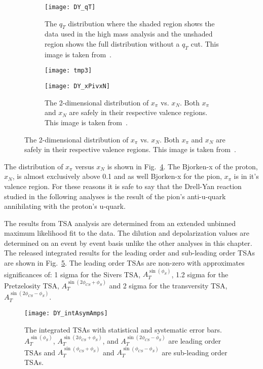 \begin{figure}[h!t]
  \centering
  \begin{subfigure}{0.45\textwidth}
    \centering \texttt{[image: DY\_qT]}
    \caption{The $q_T$ distribution where the shaded region shows the data used
      in the high mass analysis and the unshaded region shows the full
      distribution without a $q_T$ cut.  This image is taken
      from~\cite{compassDYpaper}.}
    \label{fig::DY_qT}
  \end{subfigure}
  \begin{subfigure}{.02\textwidth}
    \texttt{[image: tmp3]}
    \label{fig::tmp3}%
  \end{subfigure}
    \begin{subfigure}{0.48\textwidth}
    \centering \texttt{[image: DY\_xPivxN]}
    \caption{The 2-dimensional distribution of $x_{\pi}$ vs. $x_{N}$.  Both
      $x_{\pi}$ and $x_N$ are safely in their respective valence regions.  This
      image is taken from~\cite{compassDYpaper}.}
    \label{fig::DY_xPivxN}
  \end{subfigure}
\end{figure}

The distribution of $x_{\pi}$ versus $x_N$ is shown in
Fig.~\ref{fig::DY_xPivxN}.  The Bjorken-x of the proton, $x_N$, is almost
exclusively above 0.1 and as well Bjorken-x for the pion, $x_{\pi}$ is in it's
valence region.  For these reasons it is safe to say that the Drell-Yan reaction
studied in the following analyses is the result of the pion's anti-u-quark
annihilating with the proton's u-quark.

The results from TSA analysis are determined from an extended unbinned maximum
likelihood fit to the data.  The dilution and depolarization values are
determined on an event by event basis unlike the other analyses in this chapter.
The released integrated results for the leading order and sub-leading order TSAs
are shown in Fig.~\ref{fig::DY_intAsymAmps}.  The leading order TSAs are
non-zero with approximates significances of: 1 sigma for the Sivers TSA,
$A_T^{\sin(\phi_S)}$, 1.2 sigma for the Pretzelosity TSA,
$A_T^{\sin(2\phi_{CS}+\phi_S)}$ and 2 sigma for the transversity TSA,
$A_T^{\sin(2\phi_{CS}-\phi_S)}$.

\begin{figure}[h!t]
  \centering \texttt{[image: DY\_intAsymAmps]}
  \caption{The integrated TSAs with statistical and systematic error bars.
    $A_T^{\sin(\phi_S)}$, $A_T^{\sin(2\phi_{CS}+\phi_S)}$, and
    $A_T^{\sin(2\phi_{CS}-\phi_S)}$ are leading order TSAs and
    $A_T^{\sin(\phi_{CS}+\phi_S)}$ and $A_T^{\sin(\phi_{CS}-\phi_S)}$ are
    sub-leading order TSAs.}
  \label{fig::DY_intAsymAmps}
\end{figure}

